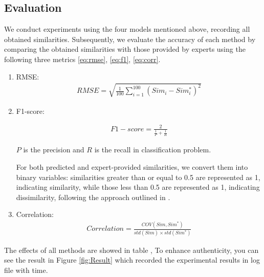 \documentclass[UTF8]{ctexart}
\begin{document}
\subsection{Evaluation}
{
    We conduct experiments using the four models mentioned above, 
    recording all obtained similarities. 
    Subsequently, we evaluate the accuracy of each method by comparing the obtained 
    similarities with those provided by experts using the following three metrics \eqref{eq:rmse}, \eqref{eq:f1}, \eqref{eq:corr}.

    \begin{enumerate}
        \item {RMSE:}{
            \begin{gather}
                RMSE = \sqrt{\frac{1}{100} \sum_{i=1}^{100} (Sim_{i} - Sim_{i}^{*})^2} \label{eq:rmse}
            \end{gather}
        }
        \item {F1-score:}{
            \begin{gather}
                F1-score = \frac{2}{\frac{1}{P} + \frac{1}{R}} \label{eq:f1}
            \end{gather}

            \qquad $P$ is the precision and $R$ is the recall in classification problem.

            \qquad For both predicted and expert-provided similarities, 
            we convert them into binary variables: 
            similarities greater than or equal to 0.5 are represented as 1, indicating similarity, 
            while those less than 0.5 are represented as 1, indicating dissimilarity, 
            following the approach outlined in \cite{ref3}.
        }
        \item {Correlation:}{
            \begin{gather}
                Correlation = \frac{COV(Sim, Sim^{*})}{std(Sim) \times std(Sim^{*})} \label{eq:corr}
            \end{gather}
        }
    \end{enumerate}

    The effects of all methods are showed in table ,
    To enhance authenticity, you can see the result in Figure \ref{fig:Result} which recorded 
    the experimental results in log file with time.

}
\end{document}
